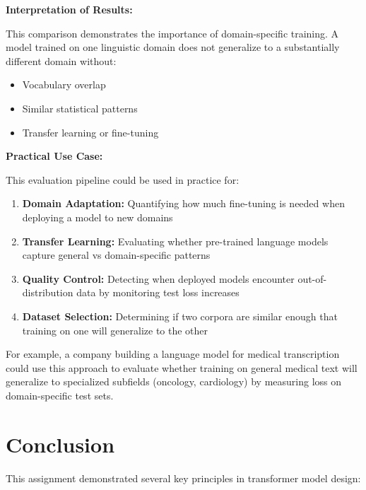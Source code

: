 \documentclass[11pt]{article}
\begin{document}
\textbf{Interpretation of Results:}

This comparison demonstrates the importance of domain-specific training. A model trained on one linguistic domain does not generalize to a substantially different domain without:
\begin{itemize}
    \item Vocabulary overlap
    \item Similar statistical patterns
    \item Transfer learning or fine-tuning
\end{itemize}

\textbf{Practical Use Case:}

This evaluation pipeline could be used in practice for:

\begin{enumerate}
    \item \textbf{Domain Adaptation:} Quantifying how much fine-tuning is needed when deploying a model to new domains
    \item \textbf{Transfer Learning:} Evaluating whether pre-trained language models capture general vs domain-specific patterns
    \item \textbf{Quality Control:} Detecting when deployed models encounter out-of-distribution data by monitoring test loss increases
    \item \textbf{Dataset Selection:} Determining if two corpora are similar enough that training on one will generalize to the other
\end{enumerate}

For example, a company building a language model for medical transcription could use this approach to evaluate whether training on general medical text will generalize to specialized subfields (oncology, cardiology) by measuring loss on domain-specific test sets.

\section*{Conclusion}

This assignment demonstrated several key principles in transformer model design:
\end{document}
